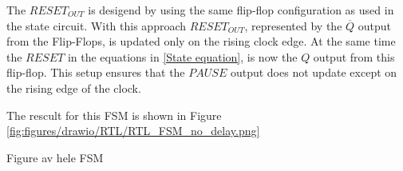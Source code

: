 The $RESET_{OUT}$ is desigend by using the same flip-flop configuration as used in the state circuit. With this approach $RESET_{OUT}$, represented by the $\overline{Q}$ output from the Flip-Flops, is updated only on the rising clock edge. At the same time the $RESET$ in the equations in \ref{State equation}, is now the $Q$ output from this flip-flop. This setup ensures that the $PAUSE$ output does not update except on the rising edge of the clock.

The rescult for this FSM is shown in Figure \ref{fig:figures/drawio/RTL/RTL_FSM_no_delay.png}



Figure av hele FSM
    


        
    
    

